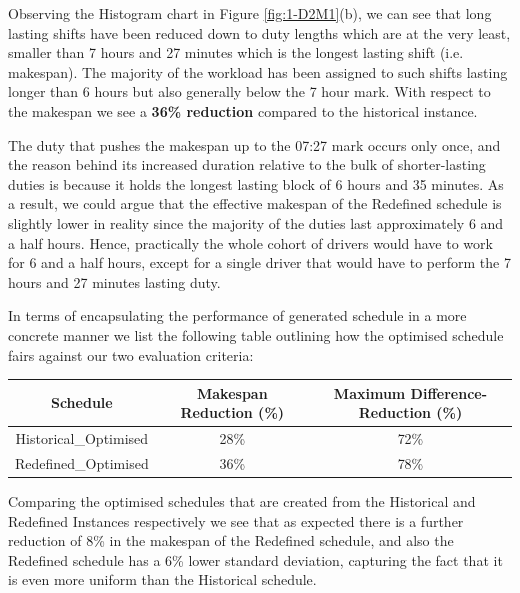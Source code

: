 \vspace{\baselineskip}
\noindent
Observing the Histogram chart in Figure \ref{fig:1-D2M1}(b), we can see that long lasting shifts have been reduced down to duty lengths which are at the very least, smaller than 7 hours and 27 minutes which is the longest lasting shift (i.e. makespan). The majority of the workload has been assigned to such shifts lasting longer than 6 hours but also generally below the 7 hour mark. With respect to the makespan we see a \textbf{36\% reduction} compared to the historical instance.

\vspace{\baselineskip}
\noindent
The duty that pushes the makespan up to the 07:27 mark occurs only once, and the reason behind its increased duration relative to the bulk of shorter-lasting duties is because it holds the longest lasting block of 6 hours and 35 minutes. As a result, we could argue that the effective makespan of the Redefined schedule is slightly lower in reality since the majority of the duties last approximately 6 and a half hours. Hence, practically the whole cohort of drivers would have to work for 6 and a half hours, except for a single driver that would have to perform the 7 hours and 27 minutes lasting duty.

\vspace{\baselineskip}
\noindent
In terms of encapsulating the performance of generated schedule in a more concrete manner we list the following table outlining how the optimised schedule fairs against our two evaluation criteria:


\begin{table}[h]
\small
    \centering 
\begin{tabular}{c|c|c}
        \textbf{Schedule} & \textbf{Makespan Reduction (\%)} & \textbf{Maximum Difference-Reduction (\%)} \\
        \hline
         Historical\_Optimised & 28\% & 72\% \\
        \hline
         Redefined\_Optimised  & 36\% & 78\% \\ 
\end{tabular}
\end{table}

\vspace{\baselineskip}
\noindent
Comparing the optimised schedules that are created from the Historical and Redefined Instances respectively we see that as expected there is a further reduction of 8\% in the makespan of the Redefined schedule, and also the Redefined schedule has a 6\% lower standard deviation, capturing the fact that it is even more uniform than the Historical schedule. 

